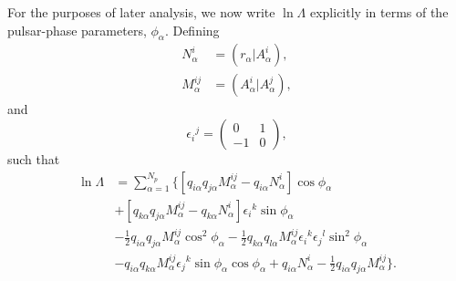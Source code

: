 \documentclass[prd,twocolumn,showpacs,nofootinbib]{revtex4}
\begin{document}
For the purposes of later analysis, we now write $\ln\Lambda$ explicitly in terms of the pulsar-phase parameters, $\phi_{\alpha}$. Defining
\begin{align}
N^i_{\alpha} &= (r_{\alpha}|A^i_{\alpha}),\nonumber\\
M^{ij}_{\alpha} &= (A^i_{\alpha}|A^j_{\alpha}),
\end{align}
and
\begin{equation}
\epsilon_i{}^j = \begin{pmatrix}0 & 1\\-1 & 0\end{pmatrix},
\end{equation}
such that
\begin{align}
\ln\Lambda& = \sum_{\alpha=1}^{N_p} \Big\{\left[q_{i\alpha}q_{j\alpha}M_{\alpha}^{ij} - q_{i\alpha}N_{\alpha}^i\right]\cos\phi_{\alpha} \nonumber\\
&+ \left[q_{k\alpha}q_{j\alpha}M_{\alpha}^{ij} - q_{k\alpha}N_{\alpha}^i\right]\epsilon_i{}^k\sin\phi_{\alpha} \nonumber\\
&- \frac{1}{2}q_{i\alpha}q_{j\alpha}M_{\alpha}^{ij}\cos^2\phi_{\alpha} - \frac{1}{2}q_{k\alpha}q_{l\alpha}M_{\alpha}^{ij}\epsilon_i{}^k\epsilon_j{}^l\sin^2\phi_{\alpha} \nonumber\\
&- q_{i\alpha}q_{k\alpha}M_{\alpha}^{ij}\epsilon_j{}^k\sin\phi_{\alpha}\cos\phi_{\alpha} + q_{i\alpha}N_{\alpha}^i - \frac{1}{2}q_{i\alpha}q_{j\alpha}M_{\alpha}^{ij}\Big\}.
\end{align}
\end{document}
